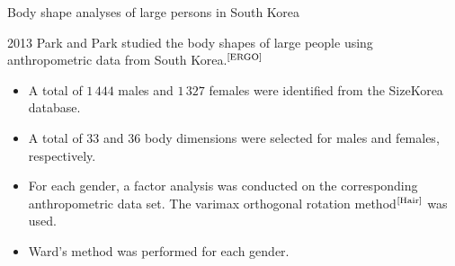 \documentclass[10pt]{beamer}
\newcommand{\bib}[1]{$^\text{\cite{#1}}$}
\begin{document}
\begin{frame}{Body shape analyses of large persons in South Korea}
	\begin{block}{2013}
		Park and Park studied the body shapes of large people using anthropometric data from South Korea.\bib{ERGO}
		\begin{itemize}
			\item A total of $1\,444$ males and $1\,327$ females were identified from the SizeKorea database.
			\item A total of 33 and 36 body dimensions were selected for males and females, respectively.
			\item For each gender, a factor analysis was conducted on the corresponding anthropometric data set. The varimax orthogonal rotation method\bib{Hair} was used.
			\item Ward's method was performed for each gender.
		\end{itemize}
	\end{block}
\end{frame}
\end{document}

